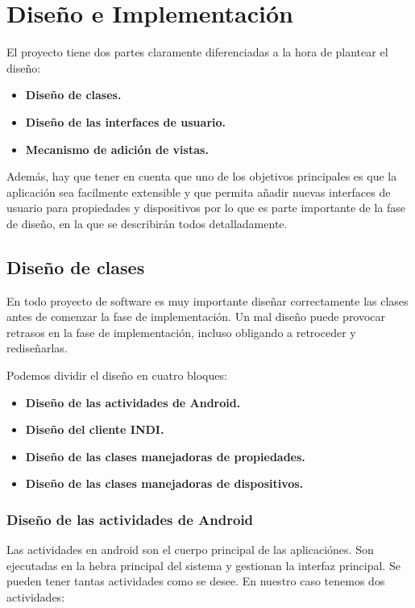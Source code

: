 \chapter{Diseño e Implementación}

El proyecto tiene dos partes claramente diferenciadas a la hora de plantear el diseño:

\begin{itemize}
  \item \textbf{Diseño de clases.}
  \item \textbf{Diseño de las interfaces de usuario.}
  \item \textbf{Mecanismo de adición de vistas.}
\end{itemize}

Además, hay que tener en cuenta que uno de los objetivos principales es que la aplicación sea facilmente extensible y que permita añadir nuevas interfaces de usuario para propiedades y dispositivos por lo que es parte importante de la fase de diseño, en la que se describirán todos detalladamente.

\bigskip
\section{Diseño de clases}

En todo proyecto de software es muy importante diseñar correctamente las clases antes de comenzar la fase de implementación. Un mal diseño puede provocar retrasos en la fase de implementación, incluso obligando a retroceder y rediseñarlas.

\bigskip
Podemos dividir el diseño en cuatro bloques:

\begin{itemize}
  \item \textbf{Diseño de las actividades de Android.}
  \item \textbf{Diseño del cliente INDI.}
  \item \textbf{Diseño de las clases manejadoras de propiedades.}
  \item \textbf{Diseño de las clases manejadoras de dispositivos.}
\end{itemize}

\newpage
\subsection{Diseño de las actividades de Android}

Las actividades en android son el cuerpo principal de las aplicaciónes. Son ejecutadas en la hebra principal del sistema y gestionan la interfaz principal. Se pueden tener tantas actividades como se desee. En nuestro caso tenemos dos actividades:


